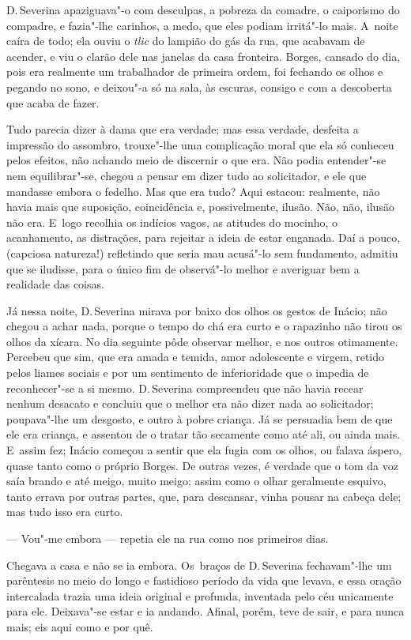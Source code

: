 \begin{linenumbers}
D.\,Severina apaziguava"-o com desculpas, a pobreza da comadre, o
caiporismo do compadre, e fazia"-lhe carinhos, a medo, que eles podiam
irritá"-lo mais. A~noite caíra de todo; ela ouviu o \emph{tlic} do
lampião do gás da rua, que acabavam de acender, e viu o clarão dele nas
janelas da casa fronteira. Borges, cansado do dia, pois era realmente um
trabalhador de primeira ordem, foi fechando os olhos e pegando no sono,
e deixou"-a só na sala, às escuras, consigo e com a descoberta que acaba
de fazer.

Tudo parecia dizer à dama que era verdade; mas essa verdade, desfeita a
impressão do assombro, trouxe"-lhe uma complicação moral que ela só
conheceu pelos efeitos, não achando meio de discernir o que era. Não
podia entender"-se nem equilibrar"-se, chegou a pensar em dizer tudo ao
solicitador, e ele que mandasse embora o fedelho. Mas que era tudo? Aqui
estacou: realmente, não havia mais que suposição, coincidência e,
possivelmente, ilusão. Não, não, ilusão não era. E~logo recolhia os
indícios vagos, as atitudes do mocinho, o acanhamento, as distrações,
para rejeitar a ideia de estar enganada. Daí a pouco, (capciosa
natureza!) refletindo que seria mau acusá"-lo sem fundamento, admitiu que
se iludisse, para o único fim de observá"-lo melhor e averiguar bem a
realidade das coisas.

Já nessa noite, D.\,Severina mirava por baixo dos olhos os gestos de
Inácio; não chegou a achar nada, porque o tempo do chá era curto e o
rapazinho não tirou os olhos da xícara. No dia seguinte pôde observar
melhor, e nos outros otimamente. Percebeu que sim, que era amada e
temida, amor adolescente e virgem, retido pelos liames sociais e por um
sentimento de inferioridade que o impedia de reconhecer"-se a si mesmo.
D.\,Severina compreendeu que não havia recear nenhum desacato e concluiu
que o melhor era não dizer nada ao solicitador; poupava"-lhe um desgosto,
e outro à pobre criança. Já se persuadia bem de que ele era criança, e
assentou de o tratar tão secamente como até ali, ou ainda mais. E~assim
fez; Inácio começou a sentir que ela fugia com os olhos, ou falava
áspero, quase tanto como o próprio Borges. De outras vezes, é verdade
que o tom da voz saía brando e até meigo, muito meigo; assim como o
olhar geralmente esquivo, tanto errava por outras partes, que, para
descansar, vinha pousar na cabeça dele; mas tudo isso era curto.

--- Vou"-me embora --- repetia ele na rua como nos primeiros dias.

Chegava a casa e não se ia embora. Os~braços de D.\,Severina fechavam"-lhe
um parêntesis no meio do longo e fastidioso período da vida que levava,
e essa oração intercalada trazia uma ideia original e profunda,
inventada pelo céu unicamente para ele. Deixava"-se estar e ia andando.
Afinal, porém, teve de sair, e para nunca mais; eis aqui como e por quê.


\end{linenumbers}
